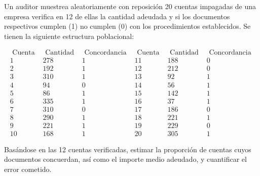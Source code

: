 

\question Un auditor muestrea aleatoriamente con reposición 20 cuentas impagadas de una empresa verifica en 12 de ellas la cantidad adeudada y si los documentos respectivos cumplen (1) no cumplen (0) con los procedimientos establecidos. Se tienen la siguiente estructura poblacional:

$$\begin{array}{lccccc}\text { Cuenta } & \text { Cantidad } & \text { Concordancia } & \text { Cuenta } & \text { Cantidad } & \text { Concordancia } \\ 1 & 278 & 1 & 11 & 188 & 0 \\ 2 & 192 & 1 & 12 & 212 & 0 \\ 3 & 310 & 1 & 13 & 92 & 1 \\ 4 & 94 & 0 & 14 & 56 & 1 \\ 5 & 86 & 1 & 15 & 142 & 1 \\ 6 & 335 & 1 & 16 & 37 & 1 \\ 7 & 310 & 0 & 17 & 186 & 0 \\ 8 & 290 & 1 & 18 & 221 & 1 \\ 9 & 221 & 1 & 19 & 229 & 0 \\ 10 & 168 & 1 & 20 & 305 & 1\end{array}$$

Basándose en las 12 cuentas verificadas, estimar la proporción de cuentas cuyos documentos concuerdan, así como el importe medio adeudado, y cuantificar el error cometido.